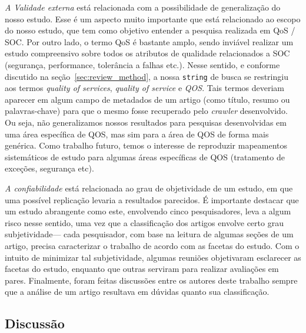 \noindent
\emph{A Validade externa} est\'{a} relacionada com a possibilidade de
generaliza\c c\~{a}o do nosso estudo. Esse \'{e} um aspecto muito
importante que est\'{a} relacionado ao escopo do nosso estudo, que tem
como objetivo entender a pesquisa realizada em QoS / SOC. Por outro
lado, o termo QoS \'{e} bastante amplo, sendo invi\'{a}vel realizar
um estudo compreensivo sobre todos os atributos de qualidade
relacionados a SOC (seguran\c ca, performance, toler\^{a}ncia a falhas
etc.). Nesse sentido, e conforme discutido na se\c c\~{a}o~\ref{sec:review_method}, a
nossa \texttt{string} de busca se restringiu aos termos \emph{quality
  of services}, \emph{quality of service} e \emph{QOS}. Tais termos
deveriam aparecer em algum campo de metadados de um artigo (como
t\'{i}tulo, resumo ou palavras-chave) para que o mesmo fosse recuperado pelo
\emph{crawler} desenvolvido. Ou seja, n\~{a}o generalizamos nossos
resultados para pesquisas desenvolvidas em uma \'{a}rea espec\'{i}fica de
QOS, mas sim para a \'{a}rea de QOS de forma mais gen\'{e}rica. Como
trabalho futuro, temos
o interesse de reproduzir mapeamentos sistem\'{a}ticos de estudo para
algumas \'{a}reas espec\'{i}ficas de QOS (tratamento de exce\c
c\~{o}es, seguran\c ca etc). 

\noindent
\emph{A confiabilidade} est\'{a} relacionada ao grau de objetividade de
um estudo, em que uma poss\'{i}vel replica\c c\~{a}o levaria a
resultados parecidos. \'{E} importante destacar que um estudo abrangente como este,
envolvendo cinco pesquisadores, leva a algum risco nesse sentido,
uma vez que a classifica\c c\~{a}o dos artigos envolve certo grau
subjetividade--- cada pesquisador, com base na leitura de algumas
se\c c\~{o}es de um artigo, precisa caracterizar o trabalho de acordo
com as facetas do estudo. Com o intuito de minimizar tal subjetividade,
algumas reuni\~{o}es objetivaram esclarecer as facetas do estudo,
enquanto que outras serviram para realizar avalia\c c\~{o}es em
pares. Finalmente, foram feitas discuss\~{o}es entre os autores deste
trabalho sempre que a an\'{a}lise de um artigo resultava em d\'{u}vidas
quanto sua classifica\c c\~{a}o. 

\subsection{Discuss\~{a}o}